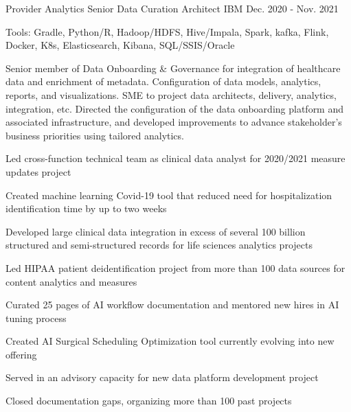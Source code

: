 \begin{cventries}
  \cvexpentry
    {Provider Analytics} %
    {Senior Data Curation Architect} %
    {IBM}
    {Dec. 2020 - Nov. 2021}
    {
      \begin{cvheavyparagraph}
        Tools: Gradle, Python/R, Hadoop/HDFS, Hive/Impala, Spark, kafka, Flink, Docker, K8s, Elasticsearch, Kibana, SQL/SSIS/Oracle
      \end{cvheavyparagraph}
    }
    {
      \begin{cvparagraph}
        Senior member of Data Onboarding \& Governance for integration of healthcare data and enrichment of metadata. Configuration of data models, analytics, reports, and visualizations. SME to project data architects, delivery, analytics, integration, etc. Directed the configuration of the data onboarding platform and associated infrastructure, and developed improvements to advance stakeholder’s business priorities using tailored analytics.
      \end{cvparagraph}
      \begin{cvitems} %
        \item {Led cross-function technical team as clinical data analyst for 2020/2021 measure updates project}
        \item {Created machine learning Covid-19 tool that reduced need for hospitalization identification time by up to two weeks}
        \item {Developed large clinical data integration in excess of several 100 billion structured and semi-structured records for life sciences analytics projects}
        \item {Led HIPAA patient deidentification project from more than 100 data sources for content analytics and measures}
        \item {Curated 25 pages of AI workflow documentation and mentored new hires in AI tuning process}
        \item {Created AI Surgical Scheduling Optimization tool currently evolving into new offering}
        \item {Served in an advisory capacity for new data platform development project}
        \item {Closed documentation gaps, organizing more than 100 past projects}
      \end{cvitems}
    }


\end{cventries}
